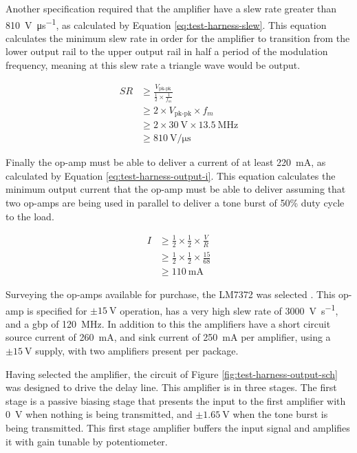 Another specification required that the amplifier have a slew rate greater than \SI{810}{\volt\per\micro\second}, as calculated by Equation \ref{eq:test-harness-slew}. This equation calculates the minimum slew rate in order for the amplifier to transition from the lower output rail to the upper output rail in half a period of the modulation frequency, meaning at this slew rate a triangle wave would be output.

\begin{align}
	SR &\geq \frac{V_\text{pk-pk}}{\frac{1}{2} \times \frac{1}{f_m}}  \nonumber \\
	&\geq 2 \times V_\text{pk-pk} \times f_m  \nonumber \\
	&\geq 2 \times \SI{30}{\volt} \times \SI{13.5}{\mega\hertz}  \nonumber \\
	&\geq \SI{810}{\volt\per\micro\second} \label{eq:test-harness-slew}
\end{align}

Finally the op-amp must be able to deliver a current of at least \SI{220}{\milli\ampere}, as calculated by Equation \ref{eq:test-harness-output-i}. This equation calculates the minimum output current that the op-amp must be able to deliver assuming that two op-amps are being used in parallel to deliver a tone burst of 50\% duty cycle to the load.

\begin{align}
I &\geq \frac{1}{2} \times \frac{1}{2} \times \frac{V}{R}  \nonumber \\
&\geq \frac{1}{2} \times \frac{1}{2} \times \frac{15}{68}  \nonumber \\
&\geq \SI{110}{\milli\ampere} \label{eq:test-harness-output-i}
\end{align}

Surveying the op-amps available for purchase, the LM7372 was selected \cite{ti2014}. This op-amp is specified for $\pm \SI{15}{\volt}$ operation, has a very high slew rate of \SI{3000}{\volt\per\second}, and a \gls{gbp} of \SI{120}{\mega\hertz}. In addition to this the amplifiers have a short circuit source current of \SI{260}{\milli\ampere}, and sink current of \SI{250}{\milli\ampere} per amplifier, using a $\pm \SI{15}{\volt}$ supply, with two amplifiers present per package.

Having selected the amplifier, the circuit of Figure \ref{fig:test-harness-output-sch} was designed to drive the delay line. This amplifier is in three stages. The first stage is a passive biasing stage that presents the input to the first amplifier with \SI{0}{\volt} when nothing is being transmitted, and $\pm \SI{1.65}{\volt}$ when the tone burst is being transmitted. This first stage amplifier buffers the input signal and amplifies it with gain tunable by potentiometer.

